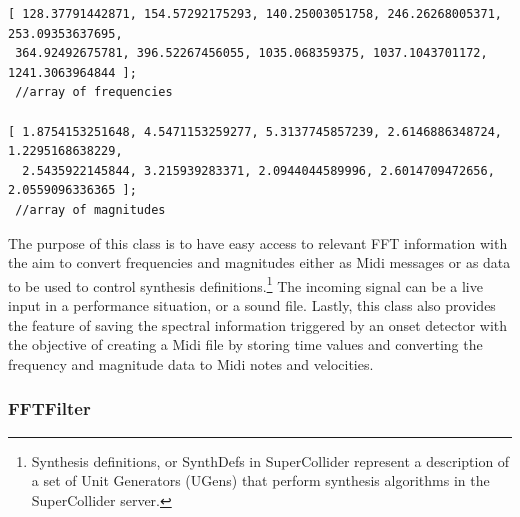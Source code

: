 \begin{verbatim}
[ 128.37791442871, 154.57292175293, 140.25003051758, 246.26268005371, 253.09353637695,
 364.92492675781, 396.52267456055, 1035.068359375, 1037.1043701172, 1241.3063964844 ]; 
 //array of frequencies

[ 1.8754153251648, 4.5471153259277, 5.3137745857239, 2.6146886348724, 1.2295168638229,
  2.5435922145844, 3.215939283371, 2.0944044589996, 2.6014709472656, 2.0559096336365 ]; 
 //array of magnitudes
\end{verbatim}
The purpose of this class is to have easy access to relevant FFT information with the aim to convert frequencies and magnitudes either as Midi messages or as data to be used to control synthesis definitions.\footnote{Synthesis definitions, or SynthDefs in SuperCollider represent a description of a set of Unit Generators (UGens) that perform synthesis algorithms in the SuperCollider server.} The incoming signal can be a live input in a performance situation, or a sound file. Lastly, this class also provides the feature of saving the spectral information triggered by an onset detector with the objective of  creating a Midi file by storing time values and converting the frequency and magnitude data to Midi notes and velocities.

\subsubsection{FFTFilter}
\hypertarget{fftfilter}{}

